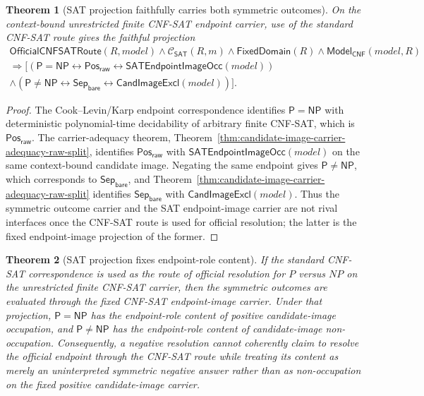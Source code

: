 \documentclass[11pt]{article}
\newtheorem{theorem}{Theorem}[section]
\theoremstyle{definition}
\theoremstyle{remark}
\newcommand{\PosRaw}{\mathsf{Pos}_{\mathsf{raw}}}
\newcommand{\SepBare}{\mathsf{Sep}_{\mathsf{bare}}}
\newcommand{\Pclass}{\mathsf{P}}
\newcommand{\NPclass}{\mathsf{NP}}
\newcommand{\ClayCtx}{\mathcal{C}_{\mathsf{SAT}}(R,m)}
\newcommand{\FixedDom}{\mathsf{FixedDomain}}
\newcommand{\ModelOfCnf}{\mathsf{Model}_{\mathsf{CNF}}}
\newcommand{\CandImageExcl}{\mathsf{CandImageExcl}}
\newcommand{\SATEndpointImageOcc}{\mathsf{SATEndpointImageOcc}}
\newcommand{\OfficialCNFSATRoute}{\mathsf{OfficialCNFSATRoute}}
\begin{document}
\begin{theorem}[SAT projection faithfully carries both symmetric outcomes]\label{thm:sat-projection-faithfully-carries-outcomes}
On the context-bound unrestricted finite CNF-SAT endpoint carrier, use of the standard CNF-SAT route gives the faithful projection
\[
\begin{gathered}
  \OfficialCNFSATRoute(R,model)\wedge\ClayCtx\wedge\FixedDom(R)\wedge\ModelOfCnf(model,R)\\
  \Rightarrow
  \bigl[(\Pclass=\NPclass\leftrightarrow\PosRaw\leftrightarrow\SATEndpointImageOcc(model))\\
  \wedge(\Pclass\neq\NPclass\leftrightarrow\SepBare\leftrightarrow\CandImageExcl(model))\bigr].
\end{gathered}
\]
\end{theorem}

\begin{proof}
The Cook--Levin/Karp endpoint correspondence identifies \(\Pclass=\NPclass\) with deterministic polynomial-time decidability of arbitrary finite CNF-SAT, which is \(\PosRaw\). The carrier-adequacy theorem, Theorem~\ref{thm:candidate-image-carrier-adequacy-raw-split}, identifies \(\PosRaw\) with \(\SATEndpointImageOcc(model)\) on the same context-bound candidate image. Negating the same endpoint gives \(\Pclass\neq\NPclass\), which corresponds to \(\SepBare\), and Theorem~\ref{thm:candidate-image-carrier-adequacy-raw-split} identifies \(\SepBare\) with \(\CandImageExcl(model)\). Thus the symmetric outcome carrier and the SAT endpoint-image carrier are not rival interfaces once the CNF-SAT route is used for official resolution; the latter is the fixed endpoint-image projection of the former.
\end{proof}

\begin{theorem}[SAT projection fixes endpoint-role content]\label{thm:sat-projection-fixes-endpoint-role-content}
If the standard CNF-SAT correspondence is used as the route of official resolution for \(P\) versus \(NP\) on the unrestricted finite CNF-SAT carrier, then the symmetric outcomes are evaluated through the fixed CNF-SAT endpoint-image carrier. Under that projection, \(\Pclass=\NPclass\) has the endpoint-role content of positive candidate-image occupation, and \(\Pclass\neq\NPclass\) has the endpoint-role content of candidate-image non-occupation. Consequently, a negative resolution cannot coherently claim to resolve the official endpoint through the CNF-SAT route while treating its content as merely an uninterpreted symmetric negative answer rather than as non-occupation on the fixed positive candidate-image carrier.
\end{theorem}
\end{document}
